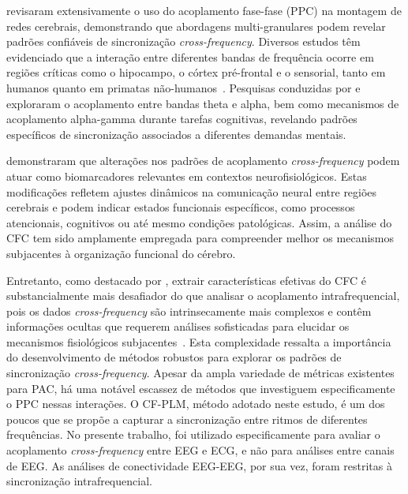  revisaram extensivamente o uso do acoplamento fase-fase (PPC) na montagem de redes cerebrais, demonstrando que abordagens multi-granulares podem revelar padrões confiáveis de sincronização \textit{cross-frequency}. Diversos estudos têm evidenciado que a interação entre diferentes bandas de frequência ocorre em regiões críticas como o hipocampo, o córtex pré-frontal e o sensorial, tanto em humanos quanto em primatas não-humanos~\cite{mormann2005phase, canolty2006high, jensen2007cross, khamechian2020decoding}. Pesquisas conduzidas por  e  exploraram o acoplamento entre bandas theta e alpha, bem como mecanismos de acoplamento alpha-gamma durante tarefas cognitivas, revelando padrões específicos de sincronização associados a diferentes demandas mentais.

 demonstraram que alterações nos padrões de acoplamento \textit{cross-frequency} podem atuar como biomarcadores relevantes em contextos neurofisiológicos. Estas modificações refletem ajustes dinâmicos na comunicação neural entre regiões cerebrais e podem indicar estados funcionais específicos, como processos atencionais, cognitivos ou até mesmo condições patológicas. Assim, a análise do CFC tem sido amplamente empregada para compreender melhor os mecanismos subjacentes à organização funcional do cérebro.

Entretanto, como destacado por , extrair características efetivas do CFC é substancialmente mais desafiador do que analisar o acoplamento intrafrequencial, pois os dados \textit{cross-frequency} são intrinsecamente mais complexos e contêm informações ocultas que requerem análises sofisticadas para elucidar os mecanismos fisiológicos subjacentes~\cite{ren2022multi}. Esta complexidade ressalta a importância do desenvolvimento de métodos robustos para explorar os padrões de sincronização \textit{cross-frequency}. Apesar da ampla variedade de métricas existentes para PAC, há uma notável escassez de métodos que investiguem especificamente o PPC nessas interações. O CF-PLM, método adotado neste estudo, é um dos poucos que se propõe a capturar a sincronização entre ritmos de diferentes frequências. No presente trabalho, foi utilizado especificamente para avaliar o acoplamento \textit{cross-frequency} entre EEG e ECG, e não para análises entre canais de EEG. As análises de conectividade EEG-EEG, por sua vez, foram restritas à sincronização intrafrequencial.

